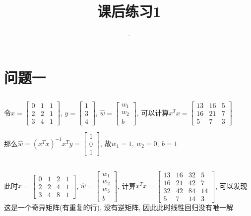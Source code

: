 \documentclass[12pt, a4paper]{article}
\title{课后练习1}
\author{-}
\date{}
\begin{document}
\maketitle %

\section{问题一}

\subsection{}

令$x = \begin{bmatrix}
    0 & 1 & 1 \\
    2 & 2 & 1 \\
    3 & 4 & 1
\end{bmatrix}$, $y = \begin{bmatrix}
    1 \\ 3 \\ 4
\end{bmatrix}$, $\hat{w} = \begin{bmatrix}
    w_1 \\ w_2 \\ b
\end{bmatrix}$, 可以计算$x^T x = \begin{bmatrix}
    13 & 16 & 5\\
    16 & 21 & 7 \\
    5 & 7 & 3
\end{bmatrix}$


那么$\hat{w} = (x^T x)^{-1}x^T y = \begin{bmatrix}
    1 \\
    0 \\
    1
\end{bmatrix}$, 故$w_1 = 1, \ w_2 = 0, \ b = 1$

\subsection{}

此时$x = \begin{bmatrix}
    0&1&2&1\\
    2&2&4&1\\
    3&4&8&1
\end{bmatrix}$, $\hat{w} = \begin{bmatrix}
    w_1\\w_2\\w_3\\b
\end{bmatrix}$, 计算$x^Tx = \begin{bmatrix}
    13&16&32&5\\
    16&21&42&7\\
    32&42&84&14\\
    5&7&14&3
\end{bmatrix}$, 可以发现这是一个奇异矩阵(有重复的行), 没有逆矩阵, 因此此时线性回归没有唯一解
\end{document}
